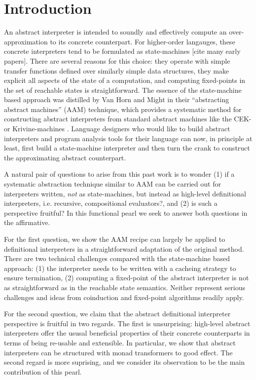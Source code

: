 \section{Introduction}

An abstract interpreter is intended to soundly and effectively compute
an over-approximation to its concrete counterpart.  For higher-order
langauges, these concrete interpreters tend to be formulated as
state-machines [cite many early papers].  There are several reasons
for this choice:
 they operate with simple transfer functions defined over
  similarly simple data structures,
 they make explicit all aspects of the state of a computation,
  and
 computing fixed-points in the set of reachable states is
  straightforward.
%
The essence of the state-machine based approach was distilled by Van
Horn and Might in their ``abstracting abstract machines'' (AAM)
technique, which provides a systematic method for constructing
abstract interpreters from standard abstract machines like the CEK- or
Krivine-machines \cite{AAM}.  Language designers who would like to
build abstract interpreters and program analysis tools for their
language can now, in principle at least, first build a state-machine
interpreter and then turn the crank to construct the approximating
abstract counterpart.

A natural pair of questions to arise from this past work is to wonder
(1) if a systematic abstraction technique similar to AAM can be
carried out for interpreters written, \emph{not} as state-machines,
but instead as high-level definitional interpreters, i.e. recursive,
compositional evaluators?, and (2) is such a perspective fruitful?  In
this functional pearl we seek to answer both questions in the
affirmative.

For the first question, we show the AAM recipe can largely be applied
to definitional interpreters in a straightforward adaptation of the
original method.  There are two technical challenges compared with the
state-machine based approach: (1) the interpreter needs to be written
with a cacheing strategy to ensure termination, (2) computing a
fixed-point of the abstract interpreter is not as straightforward as
in the reachable state semantics.  Neither represent serious
challenges and ideas from coinduction and fixed-point algorithms
readily apply.

For the second question, we claim that the abstract definitional
interpreter perspective is fruitful in two regards.  The first is
unsurprising: high-level abstract interpreters offer the ususal
beneficial properties of their concrete counterparts in terms of being
re-usable and extensible.  In particular, we show that abstract
interpreters can be structured with monad transformers to good effect.
The second regard is more suprising, and we consider its observation
to be the main contribution of this pearl.

